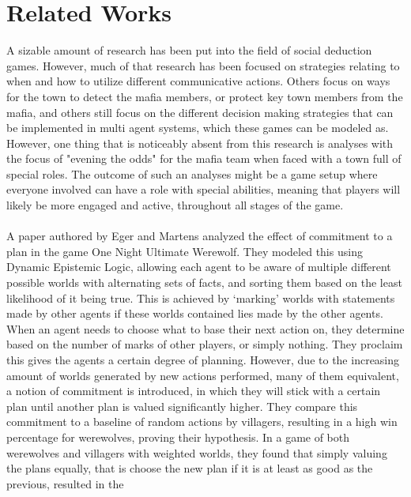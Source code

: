 \section{Related Works}
A sizable amount of research has been put into the field of social deduction 
games. However, much of that research has been focused on strategies relating 
to when and how to utilize different communicative actions\cite{commitment}. 
Others focus on ways for the town to detect the mafia 
members\cite{werewolf_stealth}, or protect key town members from the 
mafia\cite{werewolf_nash_equilibrium}, and others still focus on the different 
decision making strategies that can be implemented in multi agent systems, 
which these games can be modeled 
as\cite{modelling_multi_agent_epistemic_systems}\cite{multi_agent_epistemic_planner_common_knowledge}\cite{probibalistic_multiagent_systems}.
However, one thing that is noticeably absent from this research is analyses 
with the focus of "evening the odds" for the mafia team when faced with a town 
full of special roles. The outcome of such an analyses might be a game setup 
where everyone involved can have a role with special abilities, meaning that 
players will likely be more engaged and active, throughout all stages of the 
game. \\ \\
A paper authored by Eger and Martens\cite{commitment} analyzed the effect of 
commitment to a plan in the game One Night Ultimate Werewolf. They modeled this 
using Dynamic Epistemic Logic, allowing each agent to be aware of multiple 
different possible worlds with alternating sets of facts, and sorting them 
based on the least likelihood of it being true. This is achieved by ‘marking’ 
worlds with statements made by other agents if these worlds contained lies made 
by the other agents. When an agent needs to choose what to base their next 
action on, they determine based on the number of marks of other players, or 
simply nothing. They proclaim this gives the agents a certain degree of 
planning. However, due to the increasing amount of worlds generated by new 
actions performed, many of them equivalent, a notion of commitment is 
introduced, in which they will stick with a certain plan until another plan is 
valued significantly higher. They compare this commitment to a baseline of 
random actions by villagers, resulting in a high win percentage for werewolves, 
proving their hypothesis. In a game of both werewolves and villagers with 
weighted worlds, they found that simply valuing the plans equally, that is 
choose the new plan if it is at least as good as the previous, resulted in the 
